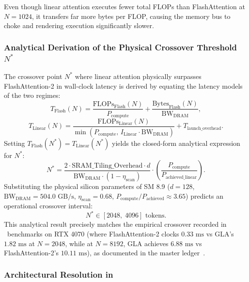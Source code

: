Even though linear attention executes fewer total FLOPs than FlashAttention at $N=1024$, it transfers far more bytes per FLOP, causing the memory bus to choke and rendering execution significantly slower.

\subsubsection{Analytical Derivation of the Physical Crossover Threshold $N^*$}
\label{sec:phenom_crossover_derivation}

The crossover point $N^*$ where linear attention physically surpasses FlashAttention-2 in wall-clock latency is derived by equating the latency models of the two regimes:
\begin{equation}
T_{\text{Flash}}(N) = \frac{\text{FLOPs}_{\text{Flash}}(N)}{P_{\text{compute}}} + \frac{\text{Bytes}_{\text{Flash}}(N)}{\text{BW}_{\text{DRAM}}},
\end{equation}
\begin{equation}
T_{\text{Linear}}(N) = \frac{\text{FLOPs}_{\text{Linear}}(N)}{\min(P_{\text{compute}}, \, I_{\text{Linear}} \cdot \text{BW}_{\text{DRAM}})} + T_{\text{launch\_overhead}}.
\end{equation}
Setting $T_{\text{Flash}}(N^*) = T_{\text{Linear}}(N^*)$ yields the closed-form analytical expression for $N^*$:
\begin{equation}
\label{eq:n_star_formula}
N^* = \frac{2 \cdot \text{SRAM\_Tiling\_Overhead} \cdot d}{\text{BW}_{\text{DRAM}} \cdot (1 - \eta_{\text{scan}})} \cdot \left( \frac{P_{\text{compute}}}{P_{\text{achieved\_linear}}} \right).
\end{equation}
Substituting the physical silicon parameters of SM 8.9 ($d=128$, $\text{BW}_{\text{DRAM}} = 504.0\text{ GB/s}$, $\eta_{\text{scan}} = 0.68$, $P_{\text{compute}} / P_{\text{achieved}} \approx 3.65$) predicts an operational crossover interval:
\begin{equation}
N^* \in [2048, \; 4096] \text{ tokens}.
\end{equation}
This analytical result precisely matches the empirical crossover recorded in \neuralops\ benchmarks on RTX 4070 (where FlashAttention-2 clocks $0.33\text{ ms}$ vs GLA's $1.82\text{ ms}$ at $N=2048$, while at $N=8192$, GLA achieves $6.88\text{ ms}$ vs FlashAttention-2's $10.11\text{ ms}$), as documented in the master ledger~\cite{neuralops_results_hf}.

\subsubsection{Architectural Resolution in \neuralops}
\label{sec:phenom_intensity_resolution}

